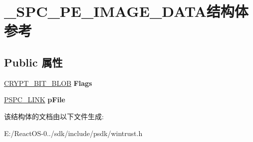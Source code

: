 \hypertarget{struct___s_p_c___p_e___i_m_a_g_e___d_a_t_a}{}\section{\+\_\+\+S\+P\+C\+\_\+\+P\+E\+\_\+\+I\+M\+A\+G\+E\+\_\+\+D\+A\+T\+A结构体 参考}
\label{struct___s_p_c___p_e___i_m_a_g_e___d_a_t_a}
\subsection*{Public 属性}
\begin{DoxyCompactItemize}
\item 
\mbox{\label{struct___s_p_c___p_e___i_m_a_g_e___d_a_t_a_a643e41b78f7b23b02263ba74a964af64}} 
\hyperlink{struct___c_r_y_p_t___b_i_t___b_l_o_b}{C\+R\+Y\+P\+T\+\_\+\+B\+I\+T\+\_\+\+B\+L\+OB} {\bfseries Flags}
\item 
\mbox{\label{struct___s_p_c___p_e___i_m_a_g_e___d_a_t_a_abb5fedf13a878a8e4558bea6769f5400}} 
\hyperlink{struct_s_p_c___l_i_n_k__}{P\+S\+P\+C\+\_\+\+L\+I\+NK} {\bfseries p\+File}
\end{DoxyCompactItemize}


该结构体的文档由以下文件生成\+:\begin{DoxyCompactItemize}
\item 
E\+:/\+React\+O\+S-\/0../sdk/include/psdk/wintrust.\+h\end{DoxyCompactItemize}

